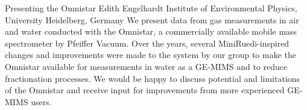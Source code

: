 \begin{conf-abstract}
{Presenting the Omnistar}
{Edith Engelhardt}
{Institute of Environmental Physics, University Heidelberg, Germany}
{We present data from gas measurements in air and water conducted with the Omnistar, a commercially available mobile mass spectrometer by Pfeiffer Vacuum. Over the years, several MiniRuedi-inspired changes and improvements were made to the system by our group to make the Omnistar available for measurements in water as a GE-MIMS and to reduce fractionation processes. We would be happy to discuss potential and limitations of the Omnistar and receive input for improvements from more experienced GE-MIMS users.}
\end{conf-abstract}
